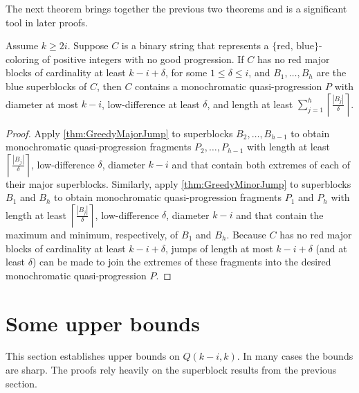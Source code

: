 The next theorem brings together the previous two theorems and is a significant tool in later proofs.

\begin{theorem}\label{thm:QP main tool}
Assume $k \geq 2i$. Suppose $C$ is a binary string that represents a $\{\mbox{red, blue}\}$-coloring of positive integers with no good progression. If $C$ has no red major blocks of cardinality at least $k-i+\delta$, for some $1 \leq \delta \leq i$, and $B_1,\ldots,B_h$ are the blue superblocks of $C$, then $C$ contains a monochromatic quasi-progression $P$ with diameter at most $k-i$, low-difference at least $\delta$, and length at least $\sum_{j=1}^h \left\lceil \frac{|B_j|}{\delta} \right\rceil$.
\end{theorem}
\begin{proof} Apply \autoref{thm:GreedyMajorJump} to superblocks $B_2,\ldots,B_{h-1}$ to obtain monochromatic quasi-progression fragments $P_2,\ldots,P_{h-1}$ with length at least $\left\lceil \frac{|B_j|}{\delta} \right\rceil$, low-difference $\delta$, diameter $k-i$ and that contain both extremes of each of their major superblocks. Similarly, apply \autoref{thm:GreedyMinorJump} to superblocks $B_1$ and $B_h$ to obtain monochromatic quasi-progression fragments $P_1$ and $P_h$ with length at least $\left\lceil \frac{|B_j|}{\delta} \right\rceil$, low-difference $\delta$, diameter $k-i$ and that contain the maximum and minimum, respectively, of $B_1$ and $B_h$. Because $C$ has no red major blocks of cardinality at least $k-i+\delta$, jumps of length at most $k-i+\delta$ (and at least $\delta$) can be made to join the extremes of these fragments into the desired monochromatic quasi-progression $P$.
\end{proof}

\section{Some upper bounds\label{sec:QP upper bounds}}

This section establishes upper bounds on $Q(k-i,k)$. In many cases the bounds are sharp. The proofs rely heavily on the superblock results from the previous section.

